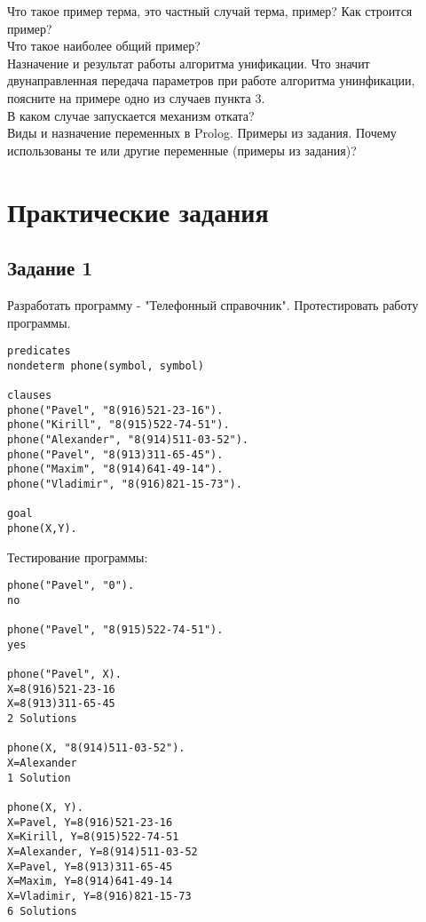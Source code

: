 Что такое пример терма, это частный случай терма, пример? Как строится пример?\\

Что такое наиболее общий пример?\\

Назначение и результат работы алгоритма унификации. Что значит двунаправленная передача параметров при работе алгоритма унинфикации, поясните на примере одно из случаев пункта 3.\\

В каком случае запускается механизм отката?\\

Виды и назначение переменных в Prolog. Примеры из задания. Почему использованы те или другие переменные (примеры из задания)?\\

\chapter{Практические задания}
\section{Задание 1}
Разработать программу - "Телефонный справочник". Протестировать работу программы.
\begin{lstlisting}
predicates
nondeterm phone(symbol, symbol)

clauses
phone("Pavel", "8(916)521-23-16").
phone("Kirill", "8(915)522-74-51").
phone("Alexander", "8(914)511-03-52").
phone("Pavel", "8(913)311-65-45").
phone("Maxim", "8(914)641-49-14").
phone("Vladimir", "8(916)821-15-73").

goal
phone(X,Y).
\end{lstlisting}

Тестирование программы:\\
\begin{lstlisting}
phone("Pavel", "0").
no

phone("Pavel", "8(915)522-74-51"). 
yes

phone("Pavel", X).
X=8(916)521-23-16
X=8(913)311-65-45
2 Solutions	

phone(X, "8(914)511-03-52").
X=Alexander
1 Solution  

phone(X, Y).
X=Pavel, Y=8(916)521-23-16
X=Kirill, Y=8(915)522-74-51
X=Alexander, Y=8(914)511-03-52
X=Pavel, Y=8(913)311-65-45
X=Maxim, Y=8(914)641-49-14
X=Vladimir, Y=8(916)821-15-73
6 Solutions
\end{lstlisting}

